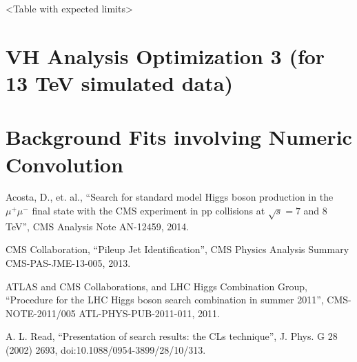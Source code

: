 \documentclass[12pt]{article}
\begin{document}
<Table with expected limits>

\section{VH Analysis Optimization 3 (for 13 TeV simulated data)}

\section{Background Fits involving Numeric Convolution}

\begin{thebibliography}{9}

  Acosta, D., et. al.,
  ``Search for standard model Higgs boson production in the $\mu^+\mu^-$ final state with the CMS experiment in pp collisions at $\sqrt{s}=7$ and 8\, TeV'',
  CMS Analysis Note AN-12459,
  2014.

  CMS Collaboration, ``Pileup Jet Identification'', 
  CMS Physics Analysis Summary CMS-PAS-JME-13-005, 
  2013.

  ATLAS and CMS Collaborations, and LHC Higgs Combination Group, ``Procedure for
  the LHC Higgs boson search combination in summer 2011'', 
  CMS-NOTE-2011/005 ATL-PHYS-PUB-2011-011, 2011.

  A. L. Read, ``Presentation of search results: the CLs technique'', J. Phys. G 28 (2002) 2693,
  doi:10.1088/0954-3899/28/10/313.

\end{thebibliography}
\end{document}
